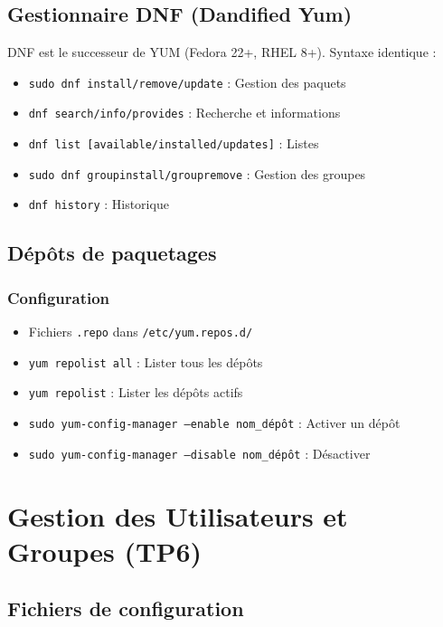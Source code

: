 \documentclass[12pt,a4paper]{article}
\begin{document}
\subsection{Gestionnaire DNF (Dandified Yum)}

DNF est le successeur de YUM (Fedora 22+, RHEL 8+). Syntaxe identique :
\begin{itemize}
    \item \texttt{sudo dnf install/remove/update} : Gestion des paquets
    \item \texttt{dnf search/info/provides} : Recherche et informations
    \item \texttt{dnf list [available/installed/updates]} : Listes
    \item \texttt{sudo dnf groupinstall/groupremove} : Gestion des groupes
    \item \texttt{dnf history} : Historique
\end{itemize}

\subsection{Dépôts de paquetages}

\subsubsection{Configuration}
\begin{itemize}
    \item Fichiers \texttt{.repo} dans \texttt{/etc/yum.repos.d/}
    \item \texttt{yum repolist all} : Lister tous les dépôts
    \item \texttt{yum repolist} : Lister les dépôts actifs
    \item \texttt{sudo yum-config-manager --enable nom\_dépôt} : Activer un dépôt
    \item \texttt{sudo yum-config-manager --disable nom\_dépôt} : Désactiver
\end{itemize}


\section{Gestion des Utilisateurs et Groupes (TP6)}

\subsection{Fichiers de configuration}
\end{document}

